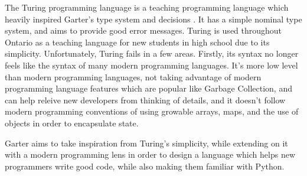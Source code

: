 The Turing programming language is a teaching programming language which
heavily inspired Garter's type system and decisions \cite{turingpaper}. It has
a simple nominal type system, and aims to provide good error messages. Turing is
used throughout Ontario as a teaching language for new students in high school
due to its simplicity. Unfortunately, Turing fails in a few areas. Firstly, its
syntax no longer feels like the syntax of many modern programming languages.
It's more low level than modern programming languages, not taking advantage of
modern programming language features which are popular like Garbage Collection,
and can help releive new developers from thinking of details, and it doesn't
follow modern programming conventions of using growable arrays, maps, and
the use of objects in order to encapsulate state.

Garter aims to take inspiration from Turing's simplicity, while extending on it
with a modern programming lens in order to design a language which helps new
programmers write good code, while also making them familiar with Python.
